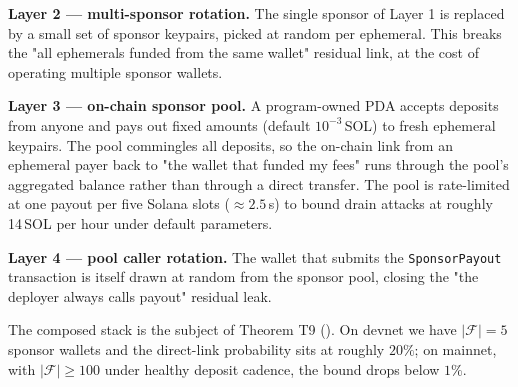\textbf{Layer 2 --- multi-sponsor rotation.} The single sponsor of Layer 1 is replaced by a small set of sponsor keypairs, picked at random per ephemeral. This breaks the "all ephemerals funded from the same wallet" residual link, at the cost of operating multiple sponsor wallets.

\textbf{Layer 3 --- on-chain sponsor pool.} A program-owned PDA accepts deposits from anyone and pays out fixed amounts (default $10^{-3}$\,SOL) to fresh ephemeral keypairs. The pool commingles all deposits, so the on-chain link from an ephemeral payer back to "the wallet that funded my fees" runs through the pool's aggregated balance rather than through a direct transfer. The pool is rate-limited at one payout per five Solana slots ($\approx 2.5$\,s) to bound drain attacks at roughly 14\,SOL per hour under default parameters.

\textbf{Layer 4 --- pool caller rotation.} The wallet that submits the \texttt{SponsorPayout} transaction is itself drawn at random from the sponsor pool, closing the "the deployer always calls payout" residual leak.

The composed stack is the subject of Theorem T9 (). On devnet we have $|\mathcal{F}| = 5$ sponsor wallets and the direct-link probability sits at roughly $20\%$; on mainnet, with $|\mathcal{F}| \geq 100$ under healthy deposit cadence, the bound drops below $1\%$.
